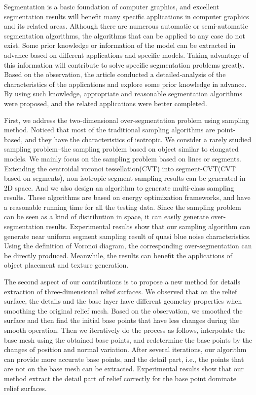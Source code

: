 \begin{englishabstract}
Segmentation is a basic foundation of computer graphics, and excellent segmentation results will benefit many specific applications in computer graphics and its related areas. Although there are numerous automatic or semi-automatic segmentation algorithms, the algorithms that can be applied to any case do not exist. Some prior knowledge or information of the model can be extracted in advance based on different applications and specific models. Taking advantage of this information will contribute to solve specific segmentation problems greatly. Based on the observation, the article conducted a detailed-analysis of the characteristics of the applications and explore some prior knowledge in advance. By using such knowledge, appropriate and reasonable segmentation algorithms were proposed, and the related applications were better completed.

First, we address the two-dimensional over-segmentation problem using sampling method. Noticed that most of the traditional sampling algorithms are point-based, and they have the characteristics of isotropic. We consider a rarely studied sampling problem--the sampling problem based on object similar to elongated models. We mainly focus on the sampling problem based on lines or segments. Extending the centroidal voronoi tessellation(CVT) into segment-CVT(CVT based on segments), non-isotropic segment sampling results can be generated in 2D space. And we also design an algorithm to generate multi-class sampling results. These algorithms are based on energy optimization frameworks, and have a reasonable running time for all the testing data. Since the sampling problem can be seen as a kind of distribution in space, it can easily generate over-segmentation results. Experimental results show that our sampling algorithm can generate near uniform segment sampling result of quasi blue noise characteristics. Using the definition of Voronoi diagram, the corresponding over-segmentation can be directly produced. Meanwhile, the results can benefit the applications of object placement and texture generation.

The second aspect of our contributions is to propose a new method for details extraction of three-dimensional relief surfaces. We observed that on the relief surface, the details and the base layer have different geometry properties when smoothing the original relief mesh. Based on the observation, we smoothed the surface and then find the initial base points that have less changes during the smooth operation. Then we iteratively do the process as follows, interpolate the base mesh using the obtained base points, and redetermine the base points by the changes of position and normal variation. After several iterations, our algorithm can provide more accurate base points, and the detail part, i.e., the points that are not on the base mesh can be extracted. Experimental results show that our method extract the detail part of relief correctly for the base point dominate relief surfaces.


\end{englishabstract}
